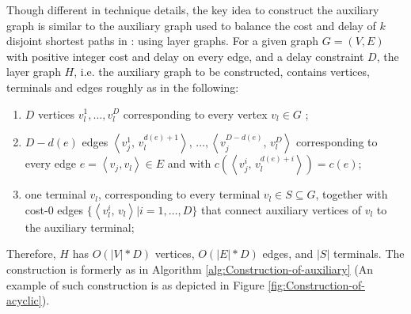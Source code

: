 \documentclass[english,runningheads,a4paper]{llncs}
\begin{document}
Though different in technique details, the key idea to construct the
auxiliary graph is similar to the auxiliary graph used to balance
the cost and delay of $k$ disjoint shortest paths in \cite{guo2013improved}:
using layer graphs. For a given graph $G=(V,E)$ with positive integer
cost and delay on every edge, and a delay constraint $D$, the layer
graph $H$, i.e. the auxiliary graph to be constructed, contains vertices,
terminals and edges roughly as in the following:
\begin{enumerate}
\item $D$ vertices $v_{l}^{1},\dots,v_{l}^{D}$ corresponding to every
vertex $v_{l}\in G$ ;
\item $D-d(e)$ edges $\left\langle v_{j}^{1},\, v_{l}^{d(e)+1}\right\rangle ,\,\dots,\left\langle v_{j}^{D-d(e)},\, v_{l}^{D}\right\rangle $
corresponding to every edge $e=\left\langle v_{j},v_{l}\right\rangle \in E$
and with $c(\left\langle v_{j}^{i},\, v_{l}^{d(e)+i}\right\rangle )=c(e)$;
\item one terminal $v_{l}$, corresponding to every terminal $v_{l}\in S\subseteq G$,
together with cost-0 edges $\{\left\langle v_{l}^{i},\, v_{l}\right\rangle \vert i=1,\dots,D\}$
that connect auxiliary vertices of $v_{l}$ to the auxiliary terminal;
\end{enumerate}
Therefore, $H$ has $O(|V|*D)$ vertices, $O(|E|*D)$ edges, and $|S|$
terminals. The construction is formerly as in Algorithm \ref{alg:Construction-of-auxiliary}
(An example of such construction is as depicted in Figure \ref{fig:Construction-of-acyclic}).
\end{document}
